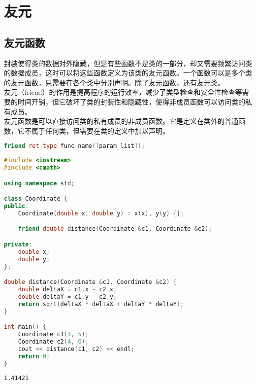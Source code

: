 \newpage

\section{友元}

\subsection{友元函数}

封装使得类的数据对外隐藏，但是有些函数不是类的一部分，却又需要频繁访问类的数据成员，这时可以将这些函数定义为该类的友元函数。一个函数可以是多个类的友元函数，只需要在各个类中分别声明。除了友元函数，还有友元类。\\

友元（friend）的作用是提高程序的运行效率，减少了类型检查和安全性检查等需要的时间开销，但它破坏了类的封装性和隐藏性，使得非成员函数可以访问类的私有成员。\\

友元函数是可以直接访问类的私有成员的非成员函数。它是定义在类外的普通函数，它不属于任何类，但需要在类的定义中加以声明。

\vspace{-0.5cm}

\begin{lstlisting}[language=C++]
friend ret_type func_name([param_list]);
\end{lstlisting}

\vspace{0.5cm}


\begin{lstlisting}[language=C++]
#include <iostream>
#include <cmath>

using namespace std;

class Coordinate {
public:
    Coordinate(double x, double y) : x(x), y(y) {};

    friend double distance(Coordinate &c1, Coordinate &c2);

private:
    double x;
    double y;
};

double distance(Coordinate &c1, Coordinate &c2) {
    double deltaX = c1.x - c2.x;
    double deltaY = c1.y - c2.y;
    return sqrt(deltaX * deltaX + deltaY * deltaY);
}

int main() {
    Coordinate c1(3, 5);
    Coordinate c2(4, 6);
    cout << distance(c1, c2) << endl;
    return 0;
}
\end{lstlisting}

\begin{tcolorbox}
	\begin{verbatim}
1.41421
	\end{verbatim}
\end{tcolorbox}

